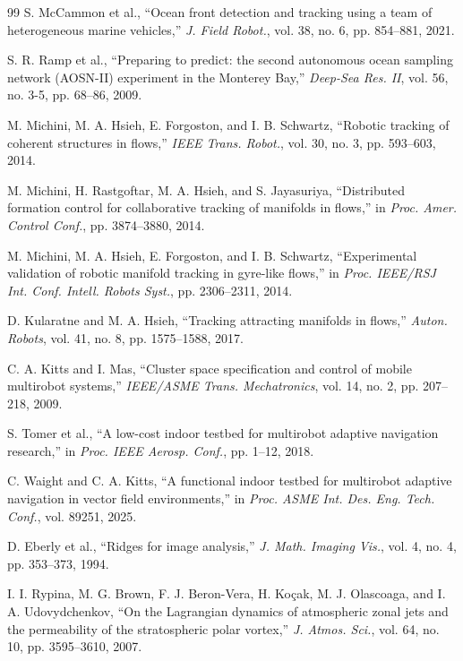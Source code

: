\documentclass[lettersize,journal]{IEEEtran}
\begin{document}
\begin{thebibliography}{99}
 S. McCammon et al., ``Ocean front detection and tracking using a
team of heterogeneous marine vehicles,'' \textit{J. Field Robot.}, vol. 38,
no. 6, pp. 854--881, 2021.

 S. R. Ramp et al., ``Preparing to predict: the second autonomous
ocean sampling network (AOSN-II) experiment in the Monterey Bay,''
\textit{Deep-Sea Res. II}, vol. 56, no. 3-5, pp. 68--86, 2009.

 M. Michini, M. A. Hsieh, E. Forgoston, and I. B. Schwartz,
``Robotic tracking of coherent structures in flows,'' \textit{IEEE Trans.
Robot.}, vol. 30, no. 3, pp. 593--603, 2014.

 M. Michini, H. Rastgoftar, M. A. Hsieh, and S. Jayasuriya,
``Distributed formation control for collaborative tracking of manifolds in
flows,'' in \textit{Proc. Amer. Control Conf.}, pp. 3874--3880, 2014.

 M. Michini, M. A. Hsieh, E. Forgoston, and I. B. Schwartz,
``Experimental validation of robotic manifold tracking in gyre-like flows,''
in \textit{Proc. IEEE/RSJ Int. Conf. Intell. Robots Syst.},
pp. 2306--2311, 2014.

 D. Kularatne and M. A. Hsieh, ``Tracking attracting manifolds in
flows,'' \textit{Auton. Robots}, vol. 41, no. 8, pp. 1575--1588, 2017.

 C. A. Kitts and I. Mas, ``Cluster space specification and control
of mobile multirobot systems,'' \textit{IEEE/ASME Trans. Mechatronics},
vol. 14, no. 2, pp. 207--218, 2009.

 S. Tomer et al., ``A low-cost indoor testbed for multirobot
adaptive navigation research,'' in \textit{Proc. IEEE Aerosp. Conf.},
pp. 1--12, 2018.

 C. Waight and C. A. Kitts, ``A functional indoor testbed for
multirobot adaptive navigation in vector field environments,'' in
\textit{Proc. ASME Int. Des. Eng. Tech. Conf.}, vol. 89251, 2025.

 D. Eberly et al., ``Ridges for image analysis,''
\textit{J. Math. Imaging Vis.}, vol. 4, no. 4, pp. 353--373, 1994.

 I. I. Rypina, M. G. Brown, F. J. Beron-Vera, H. Ko\c{c}ak,
M. J. Olascoaga, and I. A. Udovydchenkov, ``On the Lagrangian dynamics of
atmospheric zonal jets and the permeability of the stratospheric polar
vortex,'' \textit{J. Atmos. Sci.}, vol. 64, no. 10, pp. 3595--3610, 2007.


\end{thebibliography}
\end{document}
